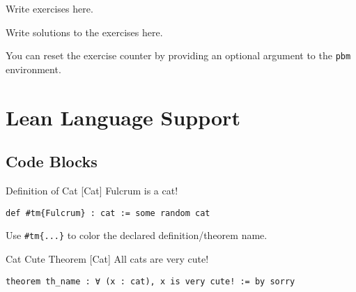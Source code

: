 \documentclass[UTF8]{ctexart}
\begin{document}
        \begin{pbm}
            Write exercises here. 
        \end{pbm}
        
        \begin{slt}
            Write solutions to the exercises here.
        \end{slt}
        
        \begin{pbm}[3]
            You can reset the exercise counter by providing an optional argument to the \texttt{pbm} environment.
        \end{pbm}

    \section{Lean Language Support}

        \subsection{Code Blocks}
        
        \begin{dfn}
            [Cat]
            {Definition of Cat}
            [Cat]
            Fulcrum is a cat!
            \begin{lstlisting}[style=lean]
    def #tm{Fulcrum} : cat := some random cat
            \end{lstlisting}

            Use \texttt{\#tm\{...\}} to color the declared definition/theorem name.
        \end{dfn}
        
        \begin{thm}
            [CatCuteTheorem]
            {Cat Cute Theorem}
            [Cat]
            All cats are very cute!
            \begin{lstlisting}[style=lean]
    theorem th_name : ∀ (x : cat), x is very cute! := by sorry
            \end{lstlisting}
        \end{thm}
\end{document}
